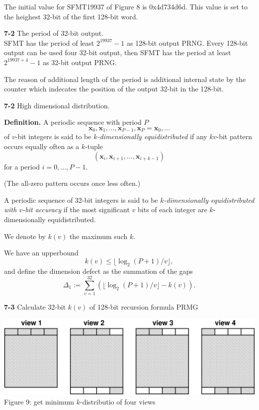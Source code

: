 \documentclass[a4j,12pt,landscape]{jarticle}
\def\bx{{{\mathbf x}}}
\begin{document}
The initial value for SFMT19937 of Figure 8 is 0x4d734d6d.
This value is set to the heighest 32-bit of the first 128-bit
word.

\newpage
{\bf 7-2} The period of 32-bit output.\\
SFMT has the period of least $2^{19937}-1$ as 128-bit output PRNG.
Every 128-bit output can be used four 32-bit output, then
SFMT has the period at least $2^{19937+4}-1$ as 32-bit output PRNG.

The reason of additional length of the period is additional 
internal state by the counter which indecates the position of
the output 32-bit in the 128-bit. 

\newpage
\noindent
{\bf 7-2} High dimensional distribution.

{\bf Definition.} 
A periodic sequence with period $P$
$$\bx_0, \bx_1, \ldots, \bx_{P-1}, \bx_P=\bx_0, \ldots$$
of $v$-bit integers is said to be {\em $k$-dimensionally equidistributed}
if any $kv$-bit pattern occurs equally often as a $k$-tuple
$$
(\bx_i, \bx_{i+1}, \ldots, \bx_{i+k-1})
$$
for a period $i=0,\ldots, P-1$. 

(The all-zero pattern occurs once less often.)

\newpage
A periodic sequence of 32-bit integers is said to be
{\em $k$-dimensionally equidistributed with $v$-bit accuracy}
if the most significant $v$ bits of each integer are
$k$-dimensionally equidistributed. 

We denote by $k(v)$ the maximum such $k$. 

\vskip 5mm
We have an upperbound 
$$
k(v) \leq \lfloor \log_2 (P+1) / v \rfloor, 
$$
and define the dimension defect as the summation of the gaps 
$$
\Delta_1 := \sum_{v=1}^{32}(\lfloor \log_2 (P+1) / v \rfloor -k(v)).
$$

\newpage
{\bf 7-3} Calculate 32-bit $k(v)$ of 128-bit recursion formula PRMG

\begin{center}
\includegraphics[width=\linewidth,height=0.6\textheight,
keepaspectratio]{view.eps}
\\
Figure 9: get minimum $k$-distributio of four views
\end{center}
\newpage
\end{document}
